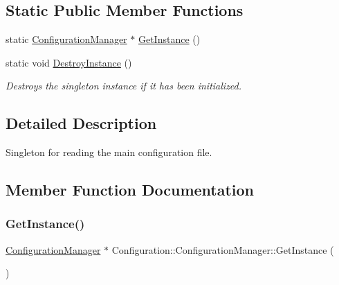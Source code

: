 \subsection*{Static Public Member Functions}
\begin{DoxyCompactItemize}
\item 
static \mbox{\hyperlink{class_configuration_1_1_configuration_manager}{Configuration\+Manager}} $\ast$ \mbox{\hyperlink{class_configuration_1_1_configuration_manager_a15849c4b82ae6f2cbe4feec3e1ba9aaf}{Get\+Instance}} ()
\item 
\mbox{\label{class_configuration_1_1_configuration_manager_ad815a5969d9d07ae99cfd76737e8659e}} 
static void \mbox{\hyperlink{class_configuration_1_1_configuration_manager_ad815a5969d9d07ae99cfd76737e8659e}{Destroy\+Instance}} ()
\begin{DoxyCompactList}\small\item\em Destroys the singleton instance if it has been initialized. \end{DoxyCompactList}\end{DoxyCompactItemize}


\subsection{Detailed Description}
Singleton for reading the main configuration file. 

\subsection{Member Function Documentation}
\mbox{\label{class_configuration_1_1_configuration_manager_a15849c4b82ae6f2cbe4feec3e1ba9aaf}} 
\subsubsection{\texorpdfstring{GetInstance()}{GetInstance()}}
{\footnotesize\ttfamily \mbox{\hyperlink{class_configuration_1_1_configuration_manager}{Configuration\+Manager}} $\ast$ Configuration\+::\+Configuration\+Manager\+::\+Get\+Instance (\begin{DoxyParamCaption}{ }\end{DoxyParamCaption})\hspace{0.3cm}{\ttfamily [static]}}

